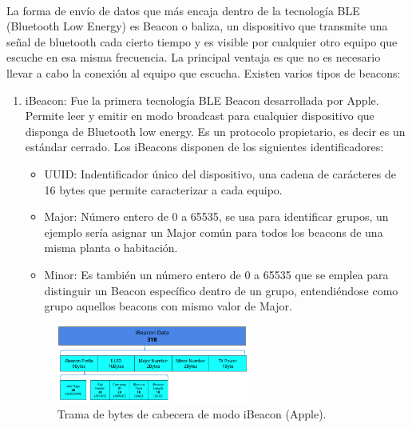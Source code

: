 \documentclass[paper=a4, fontsize=11pt,twoside]{scrartcl}	%
\begin{document}
            \paragraph{}
            La forma de envío de datos que más encaja dentro de la tecnología BLE (Bluetooth Low Energy) es Beacon o baliza, un 
            dispositivo que transmite una señal de bluetooth cada cierto tiempo y es visible por cualquier otro equipo que escuche 
            en esa misma frecuencia. La principal ventaja es que no es necesario llevar a cabo la conexión al equipo que escucha.
            Existen varios tipos de beacons:
            \begin{enumerate}
                \item iBeacon: Fue la primera tecnología BLE Beacon desarrollada por Apple. Permite leer y emitir en modo 
                broadcast para cualquier dispositivo que disponga de Bluetooth low energy. Es un protocolo propietario, es 
                decir es un estándar cerrado. 
                Los iBeacons disponen de los siguientes identificadores:
                \begin{itemize}
                    \item UUID: Indentificador único del dispositivo, una cadena de carácteres de 16 bytes
                    que permite caracterizar a cada equipo.
                    \item Major: Número entero de 0 a 65535, se usa para identificar grupos, un ejemplo sería 
                    asignar un Major común para todos los beacons de una misma planta o habitación.
                    \item Minor: Es también un número entero de 0 a 65535 que se emplea para distinguir un Beacon
                    específico dentro de un grupo, entendiéndose como grupo aquellos beacons con mismo valor de Major.
                \end{itemize}
                \begin{center}
                    \begin{figure}[ht]
                        \centering
                        \includegraphics[width=0.6\textwidth]{tipos_beacon_ibeacon.PNG}
                        \caption{Trama de bytes de cabecera de modo iBeacon (Apple).}

\end{figure}
\end{center}
\end{enumerate}
\end{document}
